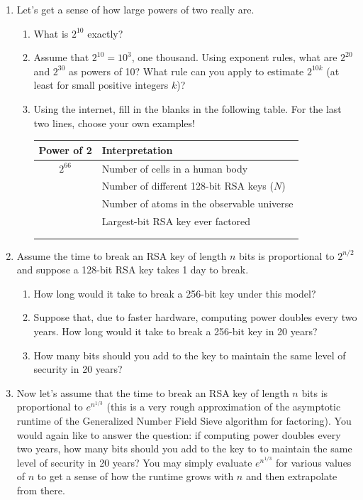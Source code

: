 \documentclass[11pt]{article}
\begin{document}

\begin{enumerate}\itemsep3ex\parindent1.5em
\item Let's get a sense of how large powers of two really are.
\begin{enumerate}
    \item What is $2^{10}$ exactly?
    \item Assume that $2^{10}=10^3$, one thousand. Using exponent rules, what are $2^{20}$ and $2^{30}$ as powers of 10?
    What rule can you apply to estimate $2^{10k}$ (at least for small positive integers $k$)?
    \item Using the internet, fill in the blanks in the following table. For the last two lines, choose your own
    examples!
   \begin{table}[h]
\centering
\begin{tabular}{|c|l|}
\hline
\textbf{Power of 2} &  \textbf{Interpretation} \\
\hline
$2^{66}$  & Number of cells in a human body \\
\hline
  & Number of different 128-bit RSA keys ($N$) \\
\hline
 & Number of atoms in the observable universe \\
\hline
 & Largest-bit RSA key ever factored \\
\hline
 &  \\
\hline
 &  \\
\hline
\end{tabular}
\end{table} 
\end{enumerate}
\item Assume the time to break an RSA key of length $n$
bits is proportional to $2^{n/2}$ and suppose a 128-bit RSA key takes 1 day to break.
\begin{enumerate}
    \item 
How long would it take to break a 256-bit key under this model?
\item Suppose that, due to faster hardware, computing power doubles every two years.
How long would it take to break a 256-bit key in 20 years?
\item How many bits should you add to the key to maintain the same level of security in 20 years?
\end{enumerate}

\item Now let's assume that the time to break an RSA key of
length $n$ bits is proportional to $e^{n^{1/3}}$ (this is a very rough approximation
of the asymptotic runtime of the Generalized Number Field Sieve algorithm for factoring).
You would again like to answer the question: if computing power doubles every two years,
how many bits should you add to the key to to maintain the same level of security in 20 years?
You may simply evaluate $e^{n^{1/3}}$ for various values of $n$ to get a sense
of how the runtime grows with $n$ and then extrapolate from there.




\end{enumerate}
\end{document}
